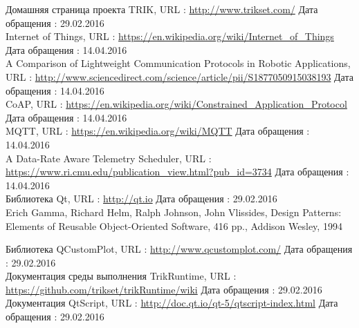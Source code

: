 \documentclass[conference]{IEEEtran}
\begin{document}
\begin{thebibliography}{1}

   Домашняя страница проекта TRIK, URL : \url{http://www.trikset.com/} Дата обращения : 29.02.2016 \\

   Internet of Things, URL : \url{https://en.wikipedia.org/wiki/Internet_of_Things} Дата обращения : 14.04.2016 \\

   A Comparison of Lightweight Communication Protocols in Robotic Applications, URL : \url{http://www.sciencedirect.com/science/article/pii/S1877050915038193} Дата обращения : 14.04.2016 \\
  
   CoAP, URL : \url{https://en.wikipedia.org/wiki/Constrained_Application_Protocol} Дата обращения : 14.04.2016 \\
  
   MQTT, URL : \url{https://en.wikipedia.org/wiki/MQTT} Дата обращения : 14.04.2016 \\
  
   A Data-Rate Aware Telemetry Scheduler, URL : \url{https://www.ri.cmu.edu/publication_view.html?pub_id=3734} Дата обращения : 14.04.2016 \\

   Библиотека Qt, URL : \url{http://qt.io} Дата обращения : 29.02.2016 \\

   Erich Gamma, Richard Helm, Ralph Johnson, John Vlissides, Design Patterns: Elements of Reusable 			Object-Oriented Software, 416 pp., Addison Wesley, 1994 

   Библиотека QCustomPlot, URL : \url{http://www.qcustomplot.com/} Дата обращения : 29.02.2016 \\

   Документация среды выполнения TrikRuntime, URL : \url{https://github.com/trikset/trikRuntime/wiki} Дата обращения : 29.02.2016 \\ 

   Документация QtScript, URL : \url{http://doc.qt.io/qt-5/qtscript-index.html} Дата обращения : 29.02.2016 \\

\end{thebibliography}
\end{document}
